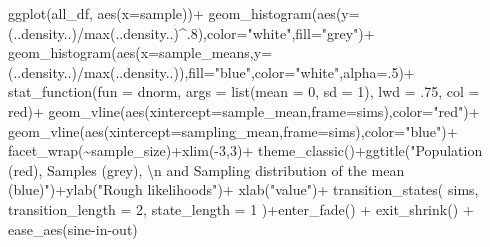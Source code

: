 \documentclass[
  letterpaper,
  DIV=11,
  numbers=noendperiod]{scrreprt}
\newenvironment{Shaded}{\begin{snugshade}}{\end{snugshade}}
\newcommand{\AttributeTok}[1]{\textcolor[rgb]{0.40,0.45,0.13}{#1}}
\newcommand{\DecValTok}[1]{\textcolor[rgb]{0.68,0.00,0.00}{#1}}
\newcommand{\FunctionTok}[1]{\textcolor[rgb]{0.28,0.35,0.67}{#1}}
\newcommand{\NormalTok}[1]{\textcolor[rgb]{0.00,0.23,0.31}{#1}}
\newcommand{\SpecialCharTok}[1]{\textcolor[rgb]{0.37,0.37,0.37}{#1}}
\newcommand{\StringTok}[1]{\textcolor[rgb]{0.13,0.47,0.30}{#1}}
\begin{document}
\begin{Shaded}
\begin{Highlighting}[]
\FunctionTok{ggplot}\NormalTok{(all\_df, }\FunctionTok{aes}\NormalTok{(}\AttributeTok{x=}\NormalTok{sample))}\SpecialCharTok{+}
  \FunctionTok{geom\_histogram}\NormalTok{(}\FunctionTok{aes}\NormalTok{(}\AttributeTok{y=}\NormalTok{(..density..)}\SpecialCharTok{/}\FunctionTok{max}\NormalTok{(..density..)}\SpecialCharTok{\^{}}\NormalTok{.}\DecValTok{8}\NormalTok{),}\AttributeTok{color=}\StringTok{"white"}\NormalTok{,}\AttributeTok{fill=}\StringTok{"grey"}\NormalTok{)}\SpecialCharTok{+}
  \FunctionTok{geom\_histogram}\NormalTok{(}\FunctionTok{aes}\NormalTok{(}\AttributeTok{x=}\NormalTok{sample\_means,}\AttributeTok{y=}\NormalTok{(..density..)}\SpecialCharTok{/}\FunctionTok{max}\NormalTok{(..density..)),}\AttributeTok{fill=}\StringTok{"blue"}\NormalTok{,}\AttributeTok{color=}\StringTok{"white"}\NormalTok{,}\AttributeTok{alpha=}\NormalTok{.}\DecValTok{5}\NormalTok{)}\SpecialCharTok{+}
  \FunctionTok{stat\_function}\NormalTok{(}\AttributeTok{fun =}\NormalTok{ dnorm, }
                \AttributeTok{args =} \FunctionTok{list}\NormalTok{(}\AttributeTok{mean =} \DecValTok{0}\NormalTok{, }\AttributeTok{sd =} \DecValTok{1}\NormalTok{), }
                \AttributeTok{lwd =}\NormalTok{ .}\DecValTok{75}\NormalTok{, }
                \AttributeTok{col =} \StringTok{\textquotesingle{}red\textquotesingle{}}\NormalTok{)}\SpecialCharTok{+}
  \FunctionTok{geom\_vline}\NormalTok{(}\FunctionTok{aes}\NormalTok{(}\AttributeTok{xintercept=}\NormalTok{sample\_mean,}\AttributeTok{frame=}\NormalTok{sims),}\AttributeTok{color=}\StringTok{"red"}\NormalTok{)}\SpecialCharTok{+}
  \FunctionTok{geom\_vline}\NormalTok{(}\FunctionTok{aes}\NormalTok{(}\AttributeTok{xintercept=}\NormalTok{sampling\_mean,}\AttributeTok{frame=}\NormalTok{sims),}\AttributeTok{color=}\StringTok{"blue"}\NormalTok{)}\SpecialCharTok{+}
  \FunctionTok{facet\_wrap}\NormalTok{(}\SpecialCharTok{\textasciitilde{}}\NormalTok{sample\_size)}\SpecialCharTok{+}\FunctionTok{xlim}\NormalTok{(}\SpecialCharTok{{-}}\DecValTok{3}\NormalTok{,}\DecValTok{3}\NormalTok{)}\SpecialCharTok{+}
  \FunctionTok{theme\_classic}\NormalTok{()}\SpecialCharTok{+}\FunctionTok{ggtitle}\NormalTok{(}\StringTok{"Population (red), Samples (grey), }\SpecialCharTok{\textbackslash{}n}\StringTok{ and Sampling distribution of the mean (blue)"}\NormalTok{)}\SpecialCharTok{+}\FunctionTok{ylab}\NormalTok{(}\StringTok{"Rough likelihoods"}\NormalTok{)}\SpecialCharTok{+}
  \FunctionTok{xlab}\NormalTok{(}\StringTok{"value"}\NormalTok{)}\SpecialCharTok{+}
  \FunctionTok{transition\_states}\NormalTok{(}
\NormalTok{    sims,}
    \AttributeTok{transition\_length =} \DecValTok{2}\NormalTok{,}
    \AttributeTok{state\_length =} \DecValTok{1}
\NormalTok{  )}\SpecialCharTok{+}\FunctionTok{enter\_fade}\NormalTok{() }\SpecialCharTok{+} 
  \FunctionTok{exit\_shrink}\NormalTok{() }\SpecialCharTok{+}
  \FunctionTok{ease\_aes}\NormalTok{(}\StringTok{\textquotesingle{}sine{-}in{-}out\textquotesingle{}}\NormalTok{)}
\end{Highlighting}
\end{Shaded}
\end{document}

